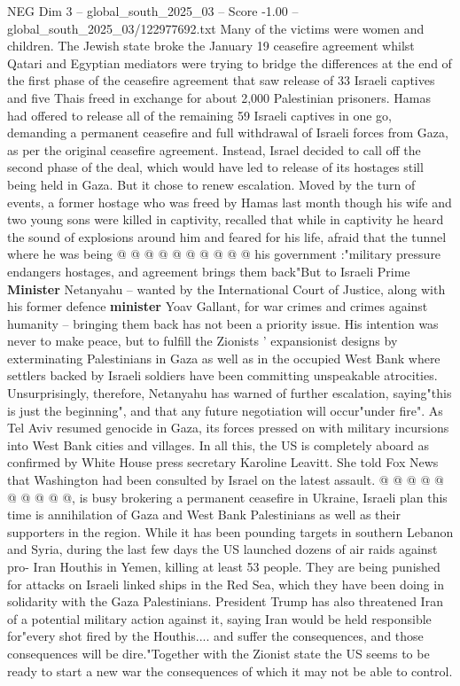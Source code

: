 \begin{textsample}{NEG Dim 3 – global\_south\_2025\_03 – Score -1.00 – global\_south\_2025\_03/122977692.txt}  \label{ex:f3_neg_427}
Many of the victims were women and children.
The Jewish state broke the January 19 ceasefire agreement whilst Qatari and Egyptian mediators were trying to bridge the differences at the end of the first phase of the ceasefire agreement that saw release of 33 Israeli captives and five Thais freed in exchange for about 2,000 Palestinian prisoners.
Hamas had offered to release all of the remaining 59 Israeli captives in one go, demanding a permanent ceasefire and full withdrawal of Israeli forces from Gaza, as per the original ceasefire agreement.
Instead, Israel decided to call off the second phase of the deal, which would have led to release of its hostages still being held in Gaza.
But it chose to renew escalation.
Moved by the turn of events, a former hostage who was freed by Hamas last month though his wife and two young sons were killed in captivity, recalled that while in captivity he heard the sound of explosions around him and feared for his life, afraid that the tunnel where he was being @ @ @ @ @ @ @ @ @ @ his government :"military pressure endangers hostages, and agreement brings them back"But to Israeli Prime \textbf{Minister} Netanyahu -- wanted by the International Court of Justice, along with his former defence \textbf{minister} Yoav Gallant, for war crimes and crimes against humanity -- bringing them back has not been a priority issue.
His intention was never to make peace, but to fulfill the Zionists ' expansionist designs by exterminating Palestinians in Gaza as well as in the occupied West Bank where settlers backed by Israeli soldiers have been committing unspeakable atrocities.
Unsurprisingly, therefore, Netanyahu has warned of further escalation, saying"this is just the beginning", and that any future negotiation will occur"under fire".
As Tel Aviv resumed genocide in Gaza, its forces pressed on with military incursions into West Bank cities and villages.
In all this, the US is completely aboard as confirmed by White House press secretary Karoline Leavitt.
She told Fox News that Washington had been consulted by Israel on the latest assault. @ @ @ @ @ @ @ @ @ @, is busy brokering a permanent ceasefire in Ukraine, Israeli plan this time is annihilation of Gaza and West Bank Palestinians as well as their supporters in the region.
While it has been pounding targets in southern Lebanon and Syria, during the last few days the US launched dozens of air raids against pro- Iran Houthis in Yemen, killing at least 53 people.
They are being punished for attacks on Israeli linked ships in the Red Sea, which they have been doing in solidarity with the Gaza Palestinians.
President Trump has also threatened Iran of a potential military action against it, saying Iran would be held responsible for"every shot fired by the Houthis.... and suffer the consequences, and those consequences will be dire."Together with the Zionist state the US seems to be ready to start a new war the consequences of which it may not be able to control.

\end{textsample}
